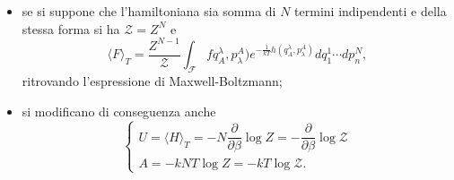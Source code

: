 \documentclass{article}
\theoremstyle{remark}
\begin{document}
\begin{itemize}
    \item se si suppone che l'hamiltoniana sia somma di $N$ termini indipendenti e della stessa forma si ha $\mathcal{Z}=Z^N$ e
    \begin{equation}
        \langle F\rangle_T=\frac{Z^{N-1}}{\mathcal{Z}}\int_{\mathcal{F}}fq^\lambda_A,p_\lambda^A)e^{-\frac{1}{kT}h(q^\lambda_A,p_\lambda^A)}dq^1_1\cdots dp_n^N,
    \end{equation}
    ritrovando l'espressione di Maxwell-Boltzmann;
    \item si modificano di conseguenza anche
    \begin{equation}
        \begin{cases}
            U=\langle H\rangle_T=-N\dfrac{\partial}{\partial\beta}\log{Z}=-\dfrac{\partial}{\partial\beta}\log{\mathcal{Z}} \\
            A=-kNT\log{Z}=-kT\log{\mathcal{Z}}.
        \end{cases}
    \end{equation}
\end{itemize}
\end{document}
